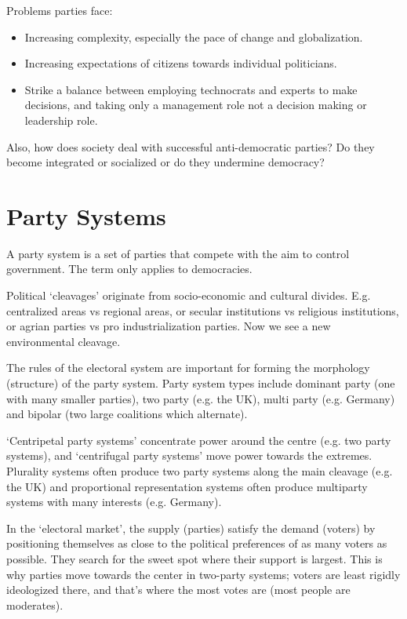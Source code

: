Problems parties face:
\begin{itemize}
  \item Increasing complexity, especially the pace of change and
    globalization.
  \item Increasing expectations of citizens towards individual
    politicians.
  \item Strike a balance between employing technocrats and experts to
    make decisions, and taking only a management role not a decision
    making or leadership role.
\end{itemize}

Also, how does society deal with successful anti-democratic parties?
Do they become integrated or socialized or do they undermine
democracy?

\section{Party Systems}

A party system is a set of parties that compete with the aim to
control government. The term only applies to democracies.

Political `cleavages' originate from socio-economic and cultural
divides. E.g. centralized areas vs regional areas, or secular
institutions vs religious institutions, or agrian parties vs pro
industrialization parties. Now we see a new environmental cleavage.

The rules of the electoral system are important for forming the
morphology (structure) of the party system. Party system types include
dominant party (one with many smaller parties), two party (e.g. the
UK), multi party (e.g. Germany) and bipolar (two large coalitions
which alternate).

`Centripetal party systems' concentrate power around the centre
(e.g. two party systems), and `centrifugal party systems' move power
towards the extremes. Plurality systems often produce two party
systems along the main cleavage (e.g. the UK) and proportional
representation systems often produce multiparty systems with many
interests (e.g. Germany).

In the `electoral market', the supply (parties) satisfy the demand
(voters) by positioning themselves as close to the political
preferences of as many voters as possible. They search for the sweet
spot where their support is largest. This is why parties move towards
the center in two-party systems; voters are least rigidly ideologized
there, and that's where the most votes are (most people are moderates).

